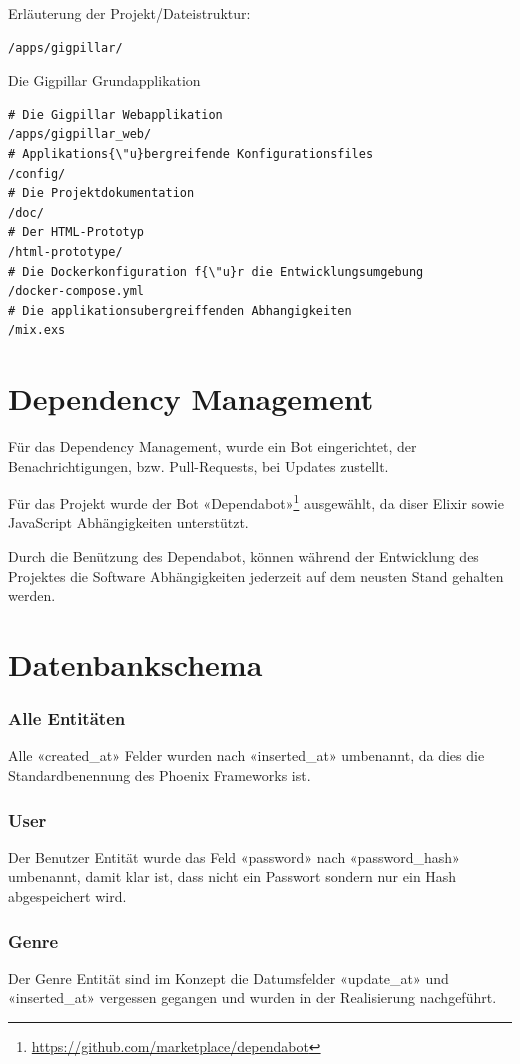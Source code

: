 \noindent
Erläuterung der Projekt/Dateistruktur:

\begin{lstlisting}[frame=single]
/apps/gigpillar/
\end{lstlisting}
Die Gigpillar Grundapplikation

\begin{lstlisting}[frame=single]
# Die Gigpillar Webapplikation
/apps/gigpillar_web/
# Applikations{\"u}bergreifende Konfigurationsfiles
/config/
# Die Projektdokumentation
/doc/
# Der HTML-Prototyp
/html-prototype/
# Die Dockerkonfiguration f{\"u}r die Entwicklungsumgebung
/docker-compose.yml
# Die applikationsubergreiffenden Abhangigkeiten
/mix.exs
\end{lstlisting}

\section{Dependency Management}

Für das Dependency Management, wurde ein Bot eingerichtet, der
Benachrichtigungen, bzw. Pull-Requests, bei Updates zustellt.

Für das Projekt wurde der Bot «Dependabot»\footnote{\url{https://github.com/marketplace/dependabot}} ausgewählt, da diser Elixir sowie JavaScript Abhängigkeiten unterstützt.

Durch die Benützung des Dependabot, können während der Entwicklung des Projektes
die Software Abhängigkeiten jederzeit auf dem neusten Stand gehalten werden.

\clearpage
\section{Datenbankschema}

\subsubsection{Alle Entitäten}
Alle «created\_at» Felder wurden nach «inserted\_at» umbenannt, da dies die
Standardbenennung des Phoenix Frameworks ist.

\subsubsection{User}
Der Benutzer Entität wurde das Feld «password» nach «password\_hash» umbenannt,
damit klar ist, dass nicht ein Passwort sondern nur ein Hash abgespeichert wird.

\subsubsection{Genre}
Der Genre Entität sind im Konzept die Datumsfelder «update\_at» und «inserted\_at»
vergessen gegangen und wurden in der Realisierung nachgeführt.

